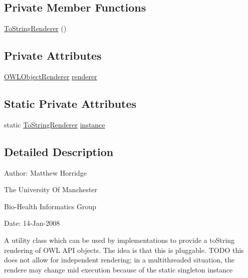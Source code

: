 \subsection*{Private Member Functions}
\begin{DoxyCompactItemize}
\item 
\hyperlink{classorg_1_1semanticweb_1_1owlapi_1_1io_1_1_to_string_renderer_a5ba3e96d43ea31795c66b57b0e4787a1}{To\-String\-Renderer} ()
\end{DoxyCompactItemize}
\subsection*{Private Attributes}
\begin{DoxyCompactItemize}
\item 
\hyperlink{interfaceorg_1_1semanticweb_1_1owlapi_1_1io_1_1_o_w_l_object_renderer}{O\-W\-L\-Object\-Renderer} \hyperlink{classorg_1_1semanticweb_1_1owlapi_1_1io_1_1_to_string_renderer_ab952a28fb0945e2b724a6fb549f47cd8}{renderer}
\end{DoxyCompactItemize}
\subsection*{Static Private Attributes}
\begin{DoxyCompactItemize}
\item 
static \hyperlink{classorg_1_1semanticweb_1_1owlapi_1_1io_1_1_to_string_renderer}{To\-String\-Renderer} \hyperlink{classorg_1_1semanticweb_1_1owlapi_1_1io_1_1_to_string_renderer_aea5b4b417c27de0ba852ba6579c4c43c}{instance}
\end{DoxyCompactItemize}


\subsection{Detailed Description}
Author\-: Matthew Horridge\par
 The University Of Manchester\par
 Bio-\/\-Health Informatics Group\par
 Date\-: 14-\/\-Jan-\/2008\par
\par
 A utility class which can be used by implementations to provide a to\-String rendering of O\-W\-L A\-P\-I objects. The idea is that this is pluggable. T\-O\-D\-O this does not allow for independent rendering; in a multithreaded situation, the rendere may change mid execution because of the static singleton instance 

